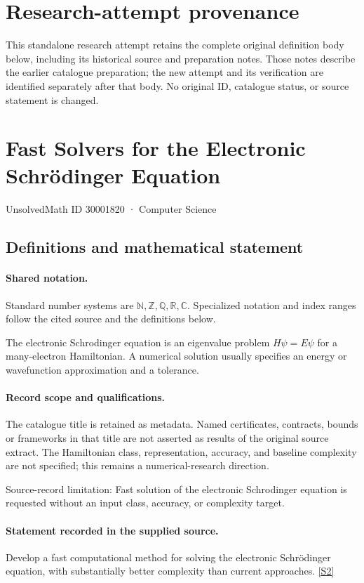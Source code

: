 \documentclass[11pt]{article}
\begin{document}
\section*{Research-attempt provenance}
This standalone research attempt retains the complete original definition body below,
including its historical source and preparation notes. Those notes describe the
earlier catalogue preparation; the new attempt and its verification are identified
separately after that body. No original ID, catalogue status, or source statement is changed.

\section{Fast Solvers for the Electronic Schrödinger Equation}\label{30001820}
{\small UnsolvedMath ID 30001820 · Computer Science}
\subsection{Definitions and mathematical statement}

\paragraph{Shared notation.}Standard number systems are $\mathbb N,\mathbb Z,\mathbb Q,\mathbb R,\mathbb C$. Specialized notation and index ranges follow the cited source and the definitions below.


The electronic Schrodinger equation is an eigenvalue problem $H\psi=E\psi$ for a many-electron Hamiltonian. A numerical solution usually specifies an energy or wavefunction approximation and a tolerance.
\paragraph{Record scope and qualifications.}
The catalogue title is retained as metadata. Named certificates, contracts, bounds or frameworks in that title are not asserted as results of the original source extract.
The Hamiltonian class, representation, accuracy, and baseline complexity are not specified; this remains a numerical-research direction.

Source-record limitation: Fast solution of the electronic Schrodinger equation is requested without an input class, accuracy, or complexity target.
\paragraph{Statement recorded in the supplied source.}
Develop a fast computational method for solving the electronic Schrödinger equation, with substantially better complexity than current approaches. \href{https://doi.org/10.4171/owr/2011/32}{[S2]}
\end{document}
